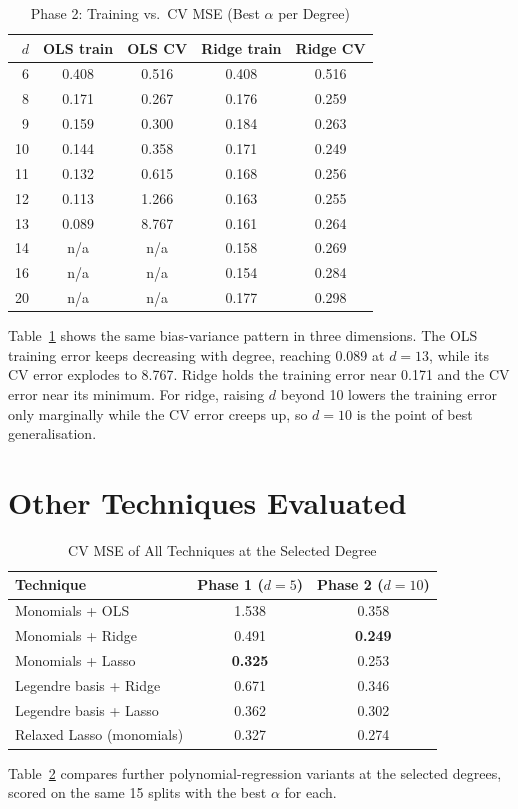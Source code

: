 \documentclass[conference]{IEEEtran}
\begin{document}
\begin{table}[!t]
\renewcommand{\arraystretch}{1.12}
\caption{Phase 2: Training vs.\ CV MSE (Best $\alpha$ per Degree)}
\label{tab:gap2}
\centering\footnotesize
\setlength{\tabcolsep}{4pt}
\begin{tabular}{@{}rcccc@{}}
\toprule
$d$ & OLS train & OLS CV & Ridge train & Ridge CV \\
\midrule
6 & 0.408 & 0.516 & 0.408 & 0.516 \\
8 & 0.171 & 0.267 & 0.176 & 0.259 \\
9 & 0.159 & 0.300 & 0.184 & 0.263 \\
10 & 0.144 & 0.358 & 0.171 & 0.249 \\
11 & 0.132 & 0.615 & 0.168 & 0.256 \\
12 & 0.113 & 1.266 & 0.163 & 0.255 \\
13 & 0.089 & 8.767 & 0.161 & 0.264 \\
14 & n/a & n/a & 0.158 & 0.269 \\
16 & n/a & n/a & 0.154 & 0.284 \\
20 & n/a & n/a & 0.177 & 0.298 \\
\bottomrule
\end{tabular}
\end{table}

Table~\ref{tab:gap2} shows the same bias-variance pattern in three dimensions. The OLS training error keeps decreasing with degree, reaching 0.089 at $d=13$, while its CV error explodes to 8.767. Ridge holds the training error near 0.171 and the CV error near its minimum. For ridge, raising $d$ beyond 10 lowers the training error only marginally while the CV error creeps up, so $d=10$ is the point of best generalisation.

\section{Other Techniques Evaluated}\label{sec:other}
\begin{table}[!t]
\renewcommand{\arraystretch}{1.12}
\caption{CV MSE of All Techniques at the Selected Degree}
\label{tab:tech}
\centering\footnotesize
\begin{tabular}{@{}lcc@{}}
\toprule
Technique & Phase 1 ($d{=}5$) & Phase 2 ($d{=}10$) \\
\midrule
Monomials + OLS & 1.538 & 0.358 \\
Monomials + Ridge & 0.491 & \textbf{0.249} \\
Monomials + Lasso & \textbf{0.325} & 0.253 \\
Legendre basis + Ridge & 0.671 & 0.346 \\
Legendre basis + Lasso & 0.362 & 0.302 \\
Relaxed Lasso (monomials) & 0.327 & 0.274 \\
\bottomrule
\end{tabular}
\end{table}
Table~\ref{tab:tech} compares further polynomial-regression variants at the selected degrees, scored on the same 15 splits with the best $\alpha$ for each.
\end{document}
